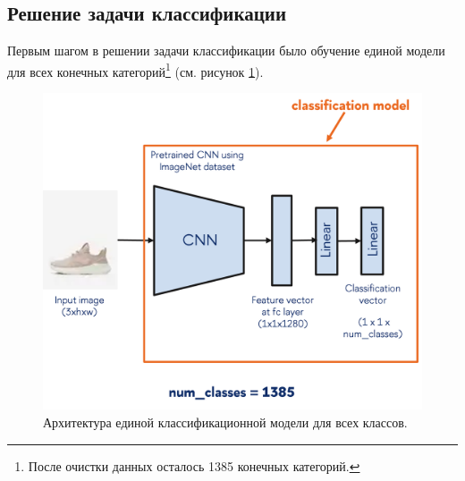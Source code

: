 \documentclass[a4paper,12pt]{extarticle}
\begin{document}
\subsection{Решение задачи классификации}\label{subsection:results-classification}

Первым шагом в решении задачи классификации было обучение единой модели для всех конечных категорий\footnote{После очистки данных осталось 1385 конечных категорий.} (см. рисунок \ref{fig:classification_onemodel}). 

\begin{figure}[ht]
	\centering
	\includegraphics[scale=0.7]{classification/classification_onemodel.png}
	\caption{Архитектура единой классификационной модели для всех классов.}
	\label{fig:classification_onemodel}
\end{figure}
\end{document}
